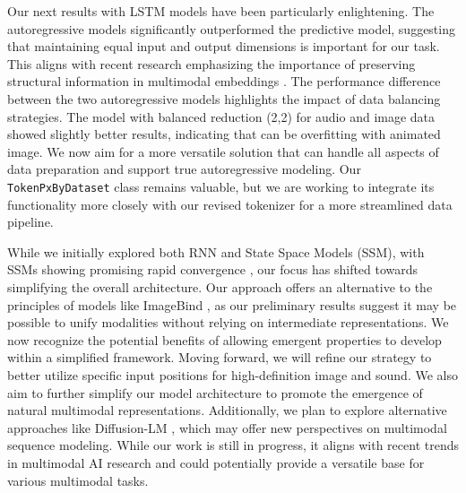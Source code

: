 \documentclass[10pt,a4paper]{article}
\begin{document}
Our next results with LSTM models have been particularly enlightening. The autoregressive models significantly outperformed the predictive model, suggesting that maintaining equal input and output dimensions is important for our task. This aligns with recent research emphasizing the importance of preserving structural information in multimodal embeddings \cite{verHo2021efficient}. The performance difference between the two autoregressive models highlights the impact of data balancing strategies. The model with balanced reduction (2,2) for audio and image data showed slightly better results, indicating that can be overfitting with animated image. We now aim for a more versatile solution that can handle all aspects of data preparation and support true autoregressive modeling. Our \texttt{TokenPxByDataset} class remains valuable, but we are working to integrate its functionality more closely with our revised tokenizer for a more streamlined data pipeline.

While we initially explored both RNN and State Space Models (SSM), with SSMs showing promising rapid convergence \cite{dao2024transformers}, our focus has shifted towards simplifying the overall architecture. Our approach offers an alternative to the principles of models like ImageBind \cite{girdhar2023imagebind}, as our preliminary results suggest it may be possible to unify modalities without relying on intermediate representations. We now recognize the potential benefits of allowing emergent properties to develop within a simplified framework. Moving forward, we will refine our strategy to better utilize specific input positions for high-definition image and sound. We also aim to further simplify our model architecture to promote the emergence of natural multimodal representations. Additionally, we plan to explore alternative approaches like Diffusion-LM \cite{li2022diffusion}, which may offer new perspectives on multimodal sequence modeling. While our work is still in progress, it aligns with recent trends in multimodal AI research \cite{baltruvsaitis2018multimodal} and could potentially provide a versatile base for various multimodal tasks.



\end{document}

